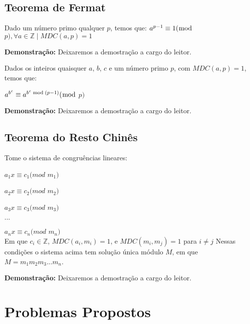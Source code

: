 \subsection{Teorema de Fermat}

\begin{theorem}\label{teorema_fermat}
Dado um número primo qualquer $p$, temos que: 
$a^{p-1} \equiv 1 (\bmod$ $p), \forall a \in \mathbb{Z} \mid MDC(a, p) = 1$
\end{theorem}
\textbf{Demonstração:}
Deixaremos a demostração a cargo do leitor.


\begin{theorem}\label{teorema_fermat_expansao}
Dados os inteiros quaisquer $a$, $b$, $c$ e um número primo $p$, com $MDC(a, p) = 1$, temos que:

$a^{b^c} \equiv a^{b^c \bmod (p-1)} (\bmod$ $p)$

\end{theorem}

\textbf{Demonstração:}
Deixaremos a demostração a cargo do leitor.


\subsection{Teorema do Resto Chinês}

\begin{theorem}
Tome o sistema de congruências lineares:

$a_1x \equiv c_1 (mod$ $m_1)$

$a_2x \equiv c_2 (mod$ $m_2)$

$a_3x \equiv c_3 (mod$ $m_3)$

$...$

$a_nx \equiv c_n (mod$ $m_n)$\\

Em que $c_i \in \mathbb{Z}$, $MDC(a_i,m_i) = 1$, e $MDC(m_i, m_j) = 1$ para $i \neq j$
Nessas condições o sistema acima tem solução única módulo $M$, em que $M = m_1m_2m_3...m_n$.
\end{theorem}
\textbf{Demonstração:}
Deixaremos a demostração a cargo do leitor.


\section{Problemas Propostos}



